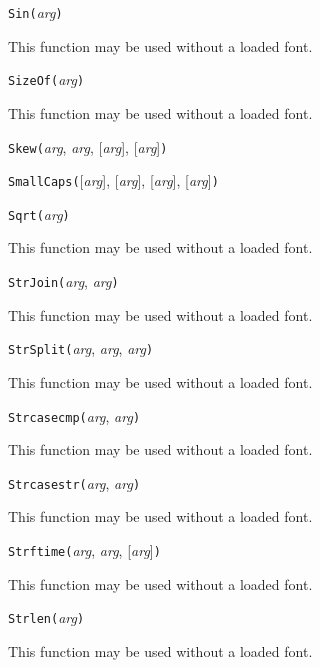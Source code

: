 
\noindent\texttt{Sin(}\textit{arg}\texttt{)}

This function may be used without a loaded font.


\noindent\texttt{SizeOf(}\textit{arg}\texttt{)}

This function may be used without a loaded font.


\noindent\texttt{Skew(}\textit{arg}, \textit{arg}, [\textit{arg}], [\textit{arg}]\texttt{)}


\noindent\texttt{SmallCaps(}[\textit{arg}], [\textit{arg}], [\textit{arg}], [\textit{arg}]\texttt{)}


\noindent\texttt{Sqrt(}\textit{arg}\texttt{)}

This function may be used without a loaded font.


\noindent\texttt{StrJoin(}\textit{arg}, \textit{arg}\texttt{)}

This function may be used without a loaded font.


\noindent\texttt{StrSplit(}\textit{arg}, \textit{arg}, \textit{arg}\texttt{)}

This function may be used without a loaded font.


\noindent\texttt{Strcasecmp(}\textit{arg}, \textit{arg}\texttt{)}

This function may be used without a loaded font.


\noindent\texttt{Strcasestr(}\textit{arg}, \textit{arg}\texttt{)}

This function may be used without a loaded font.


\noindent\texttt{Strftime(}\textit{arg}, \textit{arg}, [\textit{arg}]\texttt{)}

This function may be used without a loaded font.


\noindent\texttt{Strlen(}\textit{arg}\texttt{)}

This function may be used without a loaded font.

